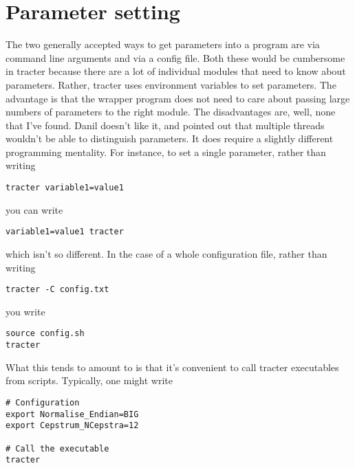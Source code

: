 \section{Parameter setting}

The two generally accepted ways to get parameters into a program are
via command line arguments and via a config file.  Both these would be
cumbersome in tracter because there are a lot of individual modules
that need to know about parameters.  Rather, tracter uses environment
variables to set parameters.  The advantage is that the wrapper
program does not need to care about passing large numbers of
parameters to the right module.  The disadvantages are, well, none
that I've found.  Danil doesn't like it, and pointed out that multiple
threads wouldn't be able to distinguish parameters.  It does require a
slightly different programming mentality.  For instance, to set a
single parameter, rather than writing
\begin{verbatim}
tracter variable1=value1
\end{verbatim}
you can write
\begin{verbatim}
variable1=value1 tracter
\end{verbatim}
which isn't so different.
In the case of a whole configuration file, rather than writing
\begin{verbatim}
tracter -C config.txt
\end{verbatim}
you write
\begin{verbatim}
source config.sh
tracter
\end{verbatim}

What this tends to amount to is that it's convenient to call tracter
executables from scripts.  Typically, one might write
\begin{verbatim}
# Configuration
export Normalise_Endian=BIG
export Cepstrum_NCepstra=12

# Call the executable
tracter
\end{verbatim}

